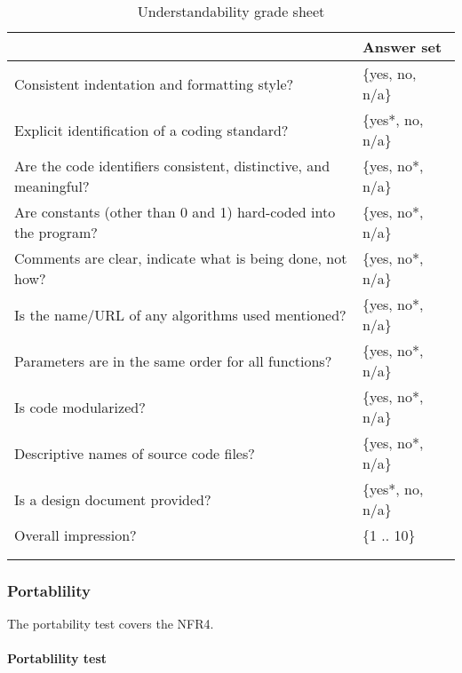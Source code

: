 \documentclass[12pt, titlepage]{article}
\begin{document}
\begin{longtable}{l l}
	\begin{tabular}{l l} 
	\toprule		
	\textbf{Questions} & \textbf{Answer set}\\
	\midrule 
	Consistent indentation and formatting style? & \{yes, no, n/a\}\\
	Explicit identification of a coding standard? & \{yes*, no, n/a\}\\
	Are the code identifiers consistent, distinctive, and meaningful? & \{yes, 
	no*, n/a\} \\
	Are constants (other than 0 and 1) hard-coded into the program? & \{yes, 
	no*, n/a\} \\
	Comments are clear, indicate what is being done, not how? & \{yes, no*, 
	n/a\} \\
	Is the name/URL of any algorithms used mentioned? & \{yes, no*, n/a\} \\
	Parameters are in the same order for all functions? & \{yes, no*, n/a\} \\
	Is code modularized? & \{yes, no*, n/a\} \\
	Descriptive names of source code files? & \{yes, no*, n/a\} \\
	Is a design document provided? & \{yes*, no, n/a\} \\
	Overall impression? & \{1 .. 10\} \\
	\bottomrule
	\caption{Understandability grade sheet} \label{Undgradesheet} \\
\end{tabular}\\
\end{longtable}

\subsubsection{Portablility} \label{port}
The portability test covers the NFR4.
\paragraph{Portablility test}
\end{document}
